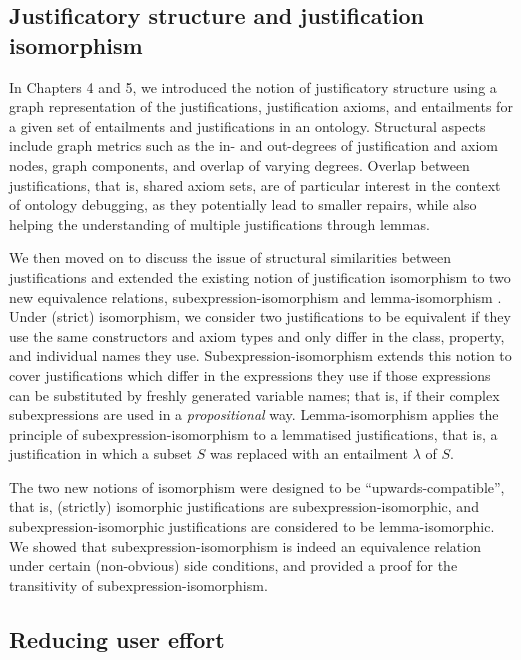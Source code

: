 \subsection{Justificatory structure and justification isomorphism}

In Chapters 4 and 5, we introduced the notion of justificatory structure using a graph representation of the justifications, justification axioms, and entailments for a given set of entailments and justifications in an ontology. Structural aspects include graph metrics such as the in- and out-degrees of justification and axiom nodes, graph components, and overlap of varying degrees. Overlap between justifications, that is, shared axiom sets, are of particular interest in the context of ontology debugging, as they potentially lead to smaller repairs, while also helping the understanding of multiple justifications through lemmas.

We then moved on to discuss the issue of structural similarities between justifications and extended the existing notion of justification isomorphism to two new equivalence relations, subexpression-isomorphism \sisom and lemma-isomorphism \lisom. Under (strict) isomorphism, we consider two justifications to be equivalent if they use the same constructors and axiom types and only differ in the class, property, and individual names they use. Subexpression-isomorphism extends this notion to cover justifications which differ in the expressions they use if those expressions can be substituted by freshly generated variable names; that is, if their complex subexpressions are used in a \emph{propositional} way. Lemma-isomorphism applies the principle of subexpression-isomorphism to a lemmatised justifications, that is, a justification in which a subset $S$ was replaced with an entailment $\lambda$ of $S$. 

The two new notions of isomorphism were designed to be \enquote{upwards-compatible}, that is, (strictly) isomorphic justifications are subexpression-isomorphic, and subexpression-isomorphic justifications are considered to be lemma-isomorphic. We showed that subexpression-isomorphism is indeed an equivalence relation under certain (non-obvious) side conditions, and provided a proof for the transitivity of subexpression-isomorphism.

\subsection{Reducing user effort}

